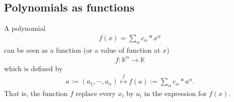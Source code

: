 \documentclass[11pt]{book}
\begin{document}
\subsection{Polynomials as functions}
A polynomial
\begin{eqnarray}
f(x) = \sum_\alpha c_\alpha * x^\alpha
\end{eqnarray}
can be seen as a function (or a value of function at $x$)
\begin{eqnarray}
f : \mathbb{K}^n \to \mathbb{K}
\end{eqnarray}
which is defined by
\begin{eqnarray}
a:=(a_1, \cdots, a_n) \stackrel{f}{\mapsto} f(a) := \sum_\alpha c_\alpha * a^\alpha.
\end{eqnarray}
That is, the function $f$ replace every $x_i$ by $a_i$ in the expression for $f(x)$.
\end{document}
